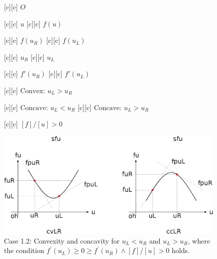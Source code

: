 \begin{figure}[ht]
	\centering
	\footnotesize

	[c] {$O$}

	[c] {$u$}
	[c] {$f(u)$}

	[c] {$f(u_{R})$}
	[c] {$f(u_{L})$}

	[c] {$u_{R}$}
	[c] {$u_{L}$}

	[c] {$f'(u_{R})$}
	[c] {$f'(u_{L})$}

	[c] {$\text{Convex: } u_{L} > u_{R}$}

	[c] {$\text{Concave: } u_{L} < u_{R}$}
	[c] {$\text{Concave: } u_{L} > u_{R}$}

	[c] {$[f]/[u]>0$}

	\includegraphics[width=0.99\textwidth]{convexityfu_case12.eps}
	\caption{Case 1.2:
	Convexity and concavity for $u_{L} < u_{R}$ and $u_{L} > u_{R}$,
	where the condition $f^\prime(u_L) \geq 0 \geq f^\prime(u_R) \wedge [f]/[u]>0$
	holds.}
	\label{\LABEL}
\end{figure}
